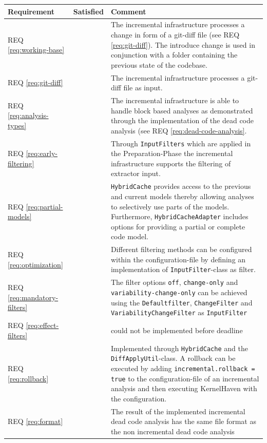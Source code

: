 \documentclass[a4paper]{article}
\newcommand{\cmark}{\ding{51}}%
\newcommand{\xmark}{\ding{55}}%
\begin{document}
\begin{longtable}{ |  L{0.17\textwidth} | C{0.12\textwidth} | L{0.63\textwidth} |}
	\hline
	\textbf{Requirement} & \textbf{Satisfied} & \textbf{Comment} \\
	\hline
	REQ \ref{req:working-base} & \cmark & The incremental infrastructure processes a change in form of a git-diff file (see REQ \ref{req:git-diff}). The introduce change is used in conjunction with a folder containing the previous state of the codebase. \\ \hline
	REQ \ref{req:git-diff} & \cmark & The incremental infrastructure processes a git-diff file as input. \\ \hline
	REQ \ref{req:analysis-types} & \cmark & The incremental infrastructure is able to handle block based analyses as demonstrated through the implementation of the dead code analysis (see REQ \ref{req:dead-code-analysis}. \\ \hline
	REQ \ref{req:early-filtering} & \cmark & Through \texttt{InputFilters} which are applied in the Preparation-Phase the incremental infrastructure supports the filtering of extractor input. \\ \hline
	REQ \ref{req:partial-models} & \cmark & \texttt{Hybrid\-Cache} provides access to the previous and current models thereby allowing analyses to selectively use parts of the models. Furthermore, \texttt{Hybrid\-Cache\-Adapter} includes options for providing a partial or complete code model. \\ \hline
	REQ \ref{req:optimization} & \cmark &  Different filtering methods can be configured within the configuration-file by defining an implementation of \texttt{InputFilter}-class as filter. \\ \hline
	REQ \ref{req:mandatory-filters} & \cmark &  The filter options \texttt{off}, \texttt{change-only} and \texttt{variability-change-only} can be achieved using the \texttt{Defaultfilter}, \texttt{ChangeFilter} and \texttt{VariabilityChangeFilter} as  \texttt{InputFilter} \\ \hline
	REQ \ref{req:effect-filters} & \xmark &  could not be implemented before deadline\\ \hline
	REQ \ref{req:rollback} & \cmark & Implemented through \texttt{Hybrid\-Cache} and the \texttt{DiffApplyUtil}-class. A rollback can be executed by adding \texttt{incremental.rollback = true} to the configuration-file of an incremental analysis and then executing KernelHaven with the configuration. \\ \hline
	REQ \ref{req:format} & \cmark & The result of the implemented incremental dead code analysis has the same file format as the non incremental dead code analysis\\ \hline

\end{longtable}
\end{document}

